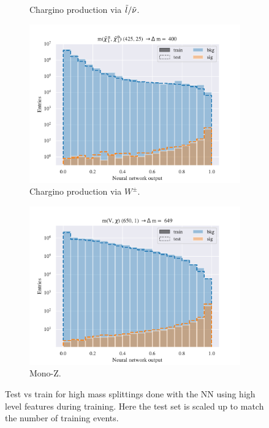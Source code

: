 \begin{figure}[H]
\begin{subfigure}[t!]{0.49\textwidth}
        \caption{Chargino production via $\Tilde{l}/\Tilde{\nu}$.}
        \label{fig:}
    \end{subfigure}    
    \begin{subfigure}[t!]{0.49\textwidth}
        \includegraphics[width = \textwidth]{Figures/WW/NN/High_level/High/scaled_train_test_395330.pdf}
        \caption{Chargino production via $W^\pm$.}
        \label{fig:}
    \end{subfigure}
    \begin{subfigure}[t!]{0.49\textwidth}
        \includegraphics[width = \textwidth]{Figures/Mono_Z/ML/NN/High_level/High/scaled_train_test_310617.pdf}
        \caption{Mono-Z.}
        \label{fig:}
    \end{subfigure}
    \caption{Test vs train for high mass splittings done with the NN using high level features during training. Here the test set is scaled up to match the number of training events.}
    \label{fig:}
\end{figure}





